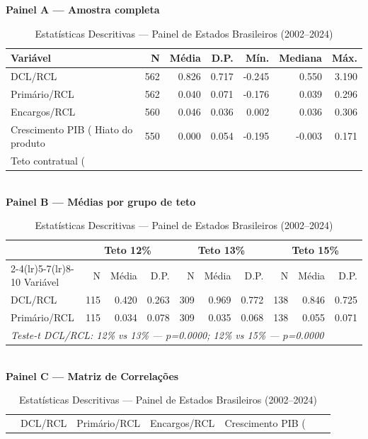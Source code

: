 \begin{table}[htbp]
\caption{Estatísticas Descritivas — Painel de Estados Brasileiros (2002--2024)}
\label{tab:descritivas}
\small

\noindent\textbf{Painel A — Amostra completa}\\[4pt]
\begin{tabular}{lrrrrrr}
\toprule
Variável & N & Média & D.P. & Mín. & Mediana & Máx. \\
\midrule
DCL/RCL & 562 & 0.826 & 0.717 & -0.245 & 0.550 & 3.190 \\
Primário/RCL & 562 & 0.040 & 0.071 & -0.176 & 0.039 & 0.296 \\
Encargos/RCL & 560 & 0.046 & 0.036 & 0.002 & 0.036 & 0.306 \\
Crescimento PIB (%
Hiato do produto & 550 & 0.000 & 0.054 & -0.195 & -0.003 & 0.171 \\
Teto contratual (%
\bottomrule
\end{tabular}\\[12pt]
\noindent\textbf{Painel B — Médias por grupo de teto}\\[4pt]
\begin{tabular}{lrrr@{\hspace{8pt}}rrr@{\hspace{8pt}}rrr}
\toprule
 & \multicolumn{3}{c}{Teto 12\%} & \multicolumn{3}{c}{Teto 13\%} & \multicolumn{3}{c}{Teto 15\%} \\
\cmidrule(lr){2-4}\cmidrule(lr){5-7}\cmidrule(lr){8-10}
Variável & N & Média & D.P. & N & Média & D.P. & N & Média & D.P. \\
\midrule
DCL/RCL & 115 & 0.420 & 0.263 & 309 & 0.969 & 0.772 & 138 & 0.846 & 0.725 \\
Primário/RCL & 115 & 0.034 & 0.078 & 309 & 0.035 & 0.068 & 138 & 0.055 & 0.071 \\
\midrule
\multicolumn{10}{l}{\textit{Teste-t DCL/RCL: 12\% vs 13\% — $p$=0.0000; 12\% vs 15\% — $p$=0.0000}} \\
\bottomrule
\end{tabular}\\[12pt]
\noindent\textbf{Painel C — Matriz de Correlações}\\[4pt]
\begin{tabular}{lrrrrrr}
\toprule
 & DCL/RCL & Primário/RCL & Encargos/RCL & Crescimento PIB (%

\end{tabular}
\end{table}
